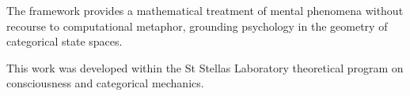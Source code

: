 \documentclass[twocolumn,amsmath,amssymb,aps,prl,superscriptaddress]{revtex4-2}
\begin{document}
The framework provides a mathematical treatment of mental phenomena without recourse to computational metaphor, grounding psychology in the geometry of categorical state spaces.

\begin{acknowledgments}
This work was developed within the St Stellas Laboratory theoretical program on consciousness and categorical mechanics.
\end{acknowledgments}


\end{document}

